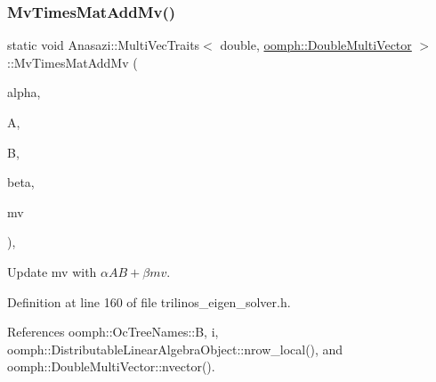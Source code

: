 \subsubsection{\texorpdfstring{Mv\+Times\+Mat\+Add\+Mv()}{MvTimesMatAddMv()}}
{\footnotesize\ttfamily static void Anasazi\+::\+Multi\+Vec\+Traits$<$ double, \hyperlink{classoomph_1_1DoubleMultiVector}{oomph\+::\+Double\+Multi\+Vector} $>$\+::Mv\+Times\+Mat\+Add\+Mv (\begin{DoxyParamCaption}\item[{const double}]{alpha,  }\item[{const \hyperlink{classoomph_1_1DoubleMultiVector}{oomph\+::\+Double\+Multi\+Vector} \&}]{A,  }\item[{const Teuchos\+::\+Serial\+Dense\+Matrix$<$ int, double $>$ \&}]{B,  }\item[{const double}]{beta,  }\item[{\hyperlink{classoomph_1_1DoubleMultiVector}{oomph\+::\+Double\+Multi\+Vector} \&}]{mv }\end{DoxyParamCaption})\hspace{0.3cm}{\ttfamily [inline]}, {\ttfamily [static]}}



Update {\ttfamily mv} with $ \alpha AB + \beta mv $. 



Definition at line 160 of file trilinos\+\_\+eigen\+\_\+solver.\+h.



References oomph\+::\+Oc\+Tree\+Names\+::B, i, oomph\+::\+Distributable\+Linear\+Algebra\+Object\+::nrow\+\_\+local(), and oomph\+::\+Double\+Multi\+Vector\+::nvector().

\mbox{\label{classAnasazi_1_1MultiVecTraits_3_01double_00_01oomph_1_1DoubleMultiVector_01_4_a338f59059891bc045555e3283949c6fa}} 
